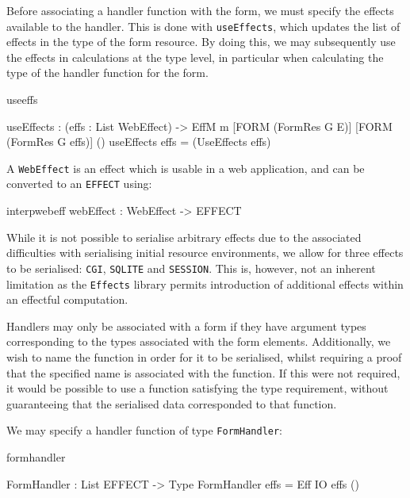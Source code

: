 Before associating a handler function with the form, we must specify the
effects available to the handler. This is done with
\texttt{useEffects}, which updates the list of effects in the type of the form
resource. By doing this, we may subsequently use the effects in calculations at
the type level, in particular when calculating the type of the handler function
for the form. 

\begin{SaveVerbatim}{useeffs}

useEffects : (effs : List WebEffect) ->
             EffM m [FORM (FormRes G E)] 
                    [FORM (FormRes G effs)] ()
useEffects effs = (UseEffects effs)

\end{SaveVerbatim}

\noindent
A \texttt{WebEffect} is an effect which is usable in a web application, and can
be converted to an \texttt{EFFECT} using:

\begin{SaveVerbatim}{interpwebeff}
webEffect : WebEffect -> EFFECT
\end{SaveVerbatim}

While it is not possible to serialise arbitrary effects due to the associated
difficulties with serialising initial resource environments, we allow for three
effects to be serialised: \texttt{CGI}, \texttt{SQLITE} and \texttt{SESSION}.
This is, however, not an inherent limitation as the \texttt{Effects} library
permits introduction of additional effects within an effectful computation.

Handlers may only be associated with a form if they have argument types
corresponding to the types associated with the form elements. Additionally, we
wish to name the function in order for it to be serialised, whilst requiring a
proof that the specified name is associated with the function. If this were not
required, it would be possible to use a function satisfying the type
requirement, without guaranteeing that the serialised data corresponded to
that function.

We may specify a handler function of type \texttt{FormHandler}:

\begin{SaveVerbatim}{formhandler}

FormHandler : List EFFECT -> Type
FormHandler effs = Eff IO effs ()

\end{SaveVerbatim}

